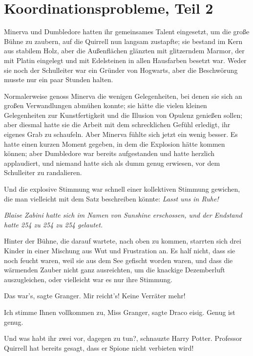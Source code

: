 \chapter{Koordinationsprobleme, Teil 2}

Minerva und Dumbledore hatten ihr gemeinsames Talent eingesetzt, um die große
Bühne zu zaubern, auf die Quirrell nun langsam zustapfte; sie bestand im Kern
aus stabilem Holz, aber die Außenflächen glänzten mit glitzerndem Marmor, der
mit Platin eingelegt und mit Edelsteinen in allen Hausfarben besetzt war. Weder
sie noch der Schulleiter war ein Gründer von Hogwarts, aber die Beschwörung
musste nur ein paar Stunden halten.

Normalerweise genoss Minerva die wenigen Gelegenheiten, bei denen sie sich an
großen Verwandlungen abmühen konnte; sie hätte die vielen kleinen Gelegenheiten
zur Kunstfertigkeit und die Illusion von Opulenz genießen sollen; aber diesmal
hatte sie die Arbeit mit dem schrecklichen Gefühl erledigt, ihr eigenes Grab zu
schaufeln. Aber Minerva fühlte sich jetzt ein wenig besser. Es hatte einen
kurzen Moment gegeben, in dem die Explosion hätte kommen können; aber Dumbledore
war bereits aufgestanden und hatte herzlich applaudiert, und niemand hatte sich
als dumm genug erwiesen, vor dem Schulleiter zu randalieren.

Und die explosive Stimmung war schnell einer kollektiven Stimmung gewichen, die
man vielleicht mit dem Satz beschreiben könnte: \emph{Lasst uns in Ruhe!}

\emph{Blaise Zabini hatte sich im Namen von Sunshine erschossen, und der
Endstand hatte 254 zu 254 zu 254 gelautet.}

Hinter der Bühne, die darauf wartete, nach oben zu kommen, starrten sich drei
Kinder in einer Mischung aus Wut und Frustration an. Es half nicht, dass sie
noch feucht waren, weil sie aus dem See gefischt worden waren, und dass die
wärmenden Zauber nicht ganz ausreichten, um die knackige Dezemberluft
auszugleichen, oder vielleicht war es nur ihre Stimmung.

\glqq{}Das war's\grqq{}, sagte Granger. \glqq{}Mir reicht's! Keine Verräter mehr!\grqq{}

\glqq{}Ich stimme Ihnen vollkommen zu, Miss Granger\grqq{}, sagte Draco eisig.
\glqq{}Genug ist genug.\grqq{}

\glqq{}Und was habt ihr zwei vor, dagegen zu tun?\grqq{}, schnauzte Harry Potter.
\glqq{}Professor Quirrell hat bereits gesagt, dass er Spione nicht verbieten
wird!\grqq{}

